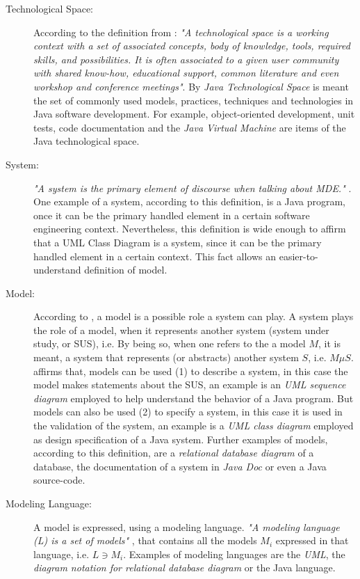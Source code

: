 \documentclass[tuberlin,cic,tc,english,noabntcite]{iiufrgs}
\begin{document}
\begin{description}
	\item[Technological Space:] According to the definition from \citet[p. 1]{kurtev2002technological}: \emph{"A technological space is a working context with a set of associated concepts, body of knowledge, tools, required skills, and possibilities. It is often associated to a given user community with shared know-how, educational support, common literature and even workshop and conference meetings"}. By \emph{Java Technological Space} is meant the set of commonly used models, practices, techniques and technologies in Java software development. For example, object-oriented development, unit tests, code documentation and the \emph{Java Virtual Machine} are items of the Java technological space.

	\item[System:] \emph{"A system is the primary element of discourse when talking about MDE."} \citep[p. 13]{favre2004foundations}. One example of a system, according to this definition, is a Java program, once it can be the primary handled element in a certain software engineering context. Nevertheless, this definition is wide enough to affirm that a UML Class Diagram is a system, since it can be the primary handled element in a certain context. This fact allows an easier-to-understand definition of model.

	\item[Model:] According to \citet{favre2004foundations}, a model is a possible role a system can play. A system plays the role of a model, when it represents another system (system under study, or SUS), i.e. By being so, when one refers to the a model $M$, it is meant, a system that represents (or abstracts) another system $S$, i.e. $M \mu S$. \citet{seidewitz2003models} affirms that, models can be used (1) to describe a system, in this case the model makes statements about the SUS, an example is an \emph{UML sequence diagram} employed to help understand the behavior of a Java program. But models can also be used (2) to specify a system, in this case it is used in the validation of the system, an example is a \emph{UML class diagram} employed as design specification of a Java system. Further examples of models, according to this definition, are a \emph{relational database diagram} of a database, the documentation of a system in \emph{Java Doc} or even a Java source-code.

	\item[Modeling Language:] A model is expressed, using a modeling language. \emph{"A modeling language (L) is a set of models"} \citep[p. 13]{favre2004foundations}, that contains all the models $M_i$ expressed in that language, i.e. $L \owns M_i$. Examples of modeling languages are the \emph{UML}, the \emph{diagram notation for relational database diagram} or the Java language.


\end{description}
\end{document}
